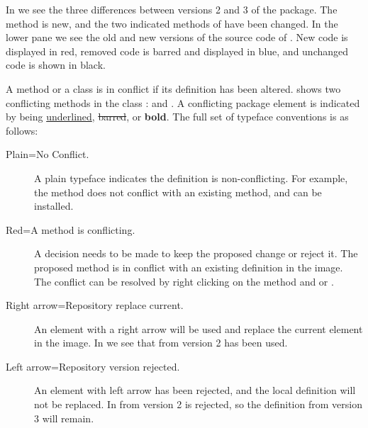 \documentclass[a4paper,10pt,twoside]{book}
\begin{document}
In  we see the three differences between versions 2 and 3 of the  package. The method  is new, and the two indicated methods of  have been changed. In the lower pane we see the old and new versions of the source code of .
New code is displayed in red, removed code is barred and displayed in blue, and unchanged code is shown in black. 

A method or a class is in conflict if its definition has been altered.  shows two conflicting methods in the class :  and . A conflicting package element is indicated by being \underline{underlined}, \sout{barred}, or {\bf bold}. The full set of typeface conventions is as follows:

\begin{description}
\item[Plain=No Conflict.] A plain typeface indicates the definition is non-conflicting. For example, the method  does not conflict with an existing method, and can be installed.
\item[Red=A method is conflicting.] A decision needs to be made to keep the proposed change or reject it. The proposed method  is in conflict with an existing definition in the image. The conflict can be resolved by right clicking on the method and  or .
\item[Right arrow=Repository replace current.] An element with a right arrow will be used and replace the current element in the image. In  we see that  from version 2 has been used.
\item[Left arrow=Repository version rejected.] An element with left arrow has been rejected, and the local definition will not be replaced. In   from version 2 is rejected, so the definition from version 3 will remain.
\end{description}


\end{document}
